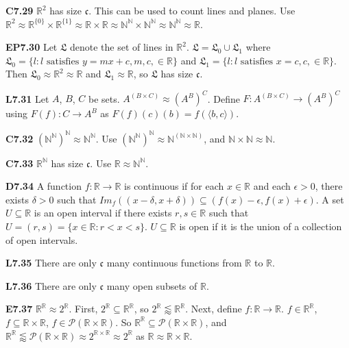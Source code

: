 \documentclass[10pt, landscape]{article}
\begin{document}
\begin{multicols*}{3}
\textbf{C7.29} $\mathbb{R}^2$ has size $\mathfrak{c}$. This can be used to count lines and planes. Use $\mathbb{R}^2\approx\mathbb{R}^{\{0\}}\times \mathbb{R}^{\{1\}}\approx \mathbb{R} \times \mathbb{R} \approx \mathbb{N}^\mathbb{N} \times \mathbb{N}^\mathbb{N} \approx \mathbb{N}^\mathbb{N}\approx\mathbb{R}$.

\textbf{EP7.30} Let $\mathfrak{L}$ denote the set of lines in $\mathbb{R}^2$. $\mathfrak{L}=\mathfrak{L}_0\cup \mathfrak{L}_1$ where $\mathfrak{L}_0=\{l : l \text{ satisfies } y = mx+c, m, c, \in \mathbb{R} \}$ and $\mathfrak{L}_1=\{l : l \text{ satisfies } x=c, c, \in \mathbb{R} \}$. Then $\mathfrak{L}_0\approx\mathbb{R}^2\approx \mathbb{R}$ and $\mathfrak{L}_1\approx \mathbb{R}$, so $\mathfrak{L}$ has size $\mathfrak{c}$.

\textbf{L7.31} Let $A$, $B$, $C$ be sets. $A^{(B \times C)}\approx (A^B)^C$. Define $F:A^{(B \times C)} \rightarrow (A^B)^C$ using $F(f):C\rightarrow A^B$ as $F(f)(c)(b)=f(\langle b,c \rangle)$.

\textbf{C7.32} $(\mathbb{N}^\mathbb{N})^\mathbb{N}\approx \mathbb{N}^\mathbb{N}$. Use $(\mathbb{N}^\mathbb{N})^\mathbb{N}\approx \mathbb{N}^{(\mathbb{N} \times \mathbb{N})}$, and $\mathbb{N} \times \mathbb{N} \approx \mathbb{N}$.

\textbf{C7.33} $\mathbb{R}^\mathbb{N}$ has size $\mathfrak{c}$. Use $\mathbb{R}\approx\mathbb{N}^\mathbb{N}$.

\textbf{D7.34} A function $f:\mathbb{R} \rightarrow \mathbb{R}$ is continuous if for each $x \in \mathbb{R}$ and each $\epsilon > 0$, there exists $\delta > 0$ such that $Im_f((x-\delta, x+\delta)) \subseteq (f(x)-\epsilon, f(x)+\epsilon)$. A set $U \subseteq \mathbb{R}$ is an open interval if there exists $r, s \in \mathbb{R}$ such that $U=(r,s)=\{x \in \mathbb{R} : r < x <s\}$. $U \subseteq \mathbb{R}$ is open if it is the union of a collection of open intervals.

\textbf{L7.35} There are only $\mathfrak{c}$ many continuous functions from $\mathbb{R}$ to $\mathbb{R}$.

\textbf{L7.36} There are only $\mathfrak{c}$ many open subsets of $\mathbb{R}$.

\textbf{E7.37} $\mathbb{R}^\mathbb{R}\approx 2^\mathbb{R}$. First, $2^\mathbb{R} \subseteq \mathbb{R}^\mathbb{R}$, so $2^\mathbb{R} \lessapprox \mathbb{R}^\mathbb{R}$. Next, define $f : \mathbb{R} \rightarrow \mathbb{R}$. $f \in \mathbb{R}^\mathbb{R}$, $f \subseteq \mathbb{R} \times \mathbb{R}$, $f \in \mathcal{P}(\mathbb{R} \times \mathbb{R})$. So $\mathbb{R}^\mathbb{R} \subseteq \mathcal{P}(\mathbb{R} \times \mathbb{R})$, and $\mathbb{R}^\mathbb{R} \lessapprox \mathcal{P}(\mathbb{R} \times \mathbb{R}) \approx 2^{\mathbb{R} \times \mathbb{R}} \approx 2^\mathbb{R}$ as $\mathbb{R} \approx \mathbb{R} \times \mathbb{R}$.


\end{multicols*}
\end{document}
